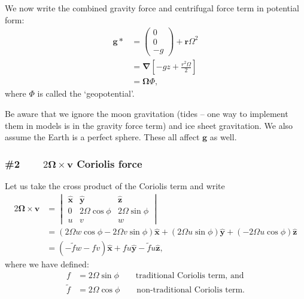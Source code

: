 We now write the combined gravity force and centrifugal force term in potential form:
\begin{align}
\boldsymbol{g}*& = \begin{pmatrix}
0\\0\\-g
\end{pmatrix} + \boldsymbol{r}\Omega^2 \nonumber\\
& = \boldsymbol{\nabla}\left[ -g z + \frac{r^2\Omega}{2} \right] \nonumber\\
& = \boldsymbol{\Omega} \Phi,
\end{align}
where $\Phi$ is called the `geopotential'.

Be aware that we ignore the moon gravitation (tides -- one way to implement them in models is in the gravity force term) and ice sheet gravitation. We also assume the Earth is a perfect sphere. These all affect $\boldsymbol{g}$ as well.

\subsubsection*{\#2 $\qquad 2 \boldsymbol{\Omega} \times \boldsymbol{v}$ \qquad Coriolis force}

Let us take the cross product of the Coriolis term and write
\begin{align}
2\boldsymbol{\Omega}\times\boldsymbol{v} & = \begin{vmatrix}
\hat{\boldsymbol{x}} & \hat{\boldsymbol{y}} & \hat{\boldsymbol{z}} \\
0 & 2\Omega\cos\phi & 2\Omega\sin\phi\\
u & v & w
\end{vmatrix} \nonumber\\
& =  (2 \Omega w \cos\phi - 2\Omega v \sin\phi )\hat{\boldsymbol{x}} +  (2\Omega u \sin \phi)\hat{\boldsymbol{y}} +  (-2 \Omega u \cos \phi)\hat{\boldsymbol{z}} \nonumber\\
& = (-\tilde{f}w - fv)\hat{\boldsymbol{x}} + fu \hat{\boldsymbol{y}} - \tilde{f}u \hat{\boldsymbol{z}},
\end{align}
where we have defined:
\begin{equation}
\begin{aligned}
f &= 2\Omega\sin\phi \qquad \text{traditional Coriolis term, and} \\
\tilde{f} &= 2\Omega\cos\phi \qquad \text{non-traditional Coriolis term.} \\
\end{aligned}
\end{equation}

